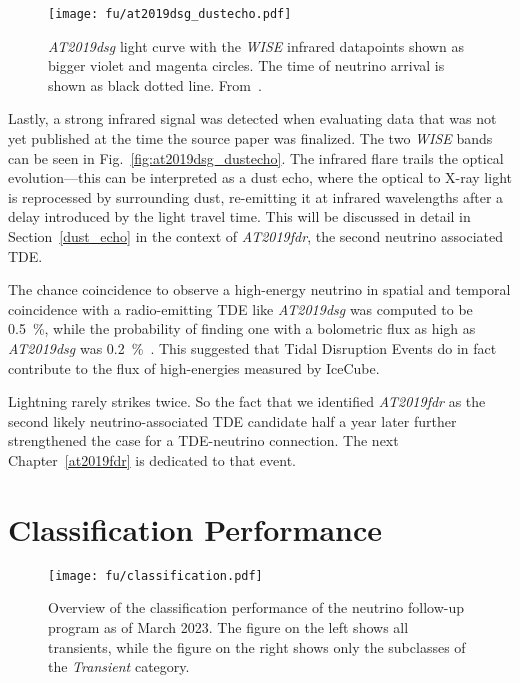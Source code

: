 \begin{figure}[htb]
    \texttt{[image: fu/at2019dsg\_dustecho.pdf]}
    \caption[\textit{AT2019dsg} infrared light curve]{\textit{AT2019dsg} light curve with the \textit{WISE} infrared datapoints shown as bigger violet and magenta circles. The time of neutrino arrival is shown as black dotted line. From~\cite{Reusch2023b}.}
\end{figure}

\pagebreak

Lastly, a strong infrared signal was detected when evaluating   data that was not yet published at the time the source paper was finalized. The two \textit{WISE} bands can be seen in Fig.~\ref{fig:at2019dsg_dustecho}. The infrared flare trails the optical evolution---this can be interpreted as a dust echo, where the optical to X-ray light is reprocessed by surrounding dust, re-emitting it at infrared wavelengths after a delay introduced by the light travel time. This will be discussed in detail in Section~\ref{dust_echo} in the context of \emph{AT2019fdr}, the second neutrino associated TDE.

The chance coincidence to observe a high-energy neutrino in spatial and temporal coincidence with a radio-emitting TDE like \emph{AT2019dsg} was computed to be \SI{0.5}{\percent}, while the probability of finding one with a bolometric flux as high as \emph{AT2019dsg} was \SI{0.2}{\percent}~\cite{Stein2021}. This suggested that Tidal Disruption Events do in fact contribute to the flux of high-energies measured by IceCube.

Lightning rarely strikes twice. So the fact that we identified \emph{AT2019fdr} as the second likely neutrino-associated TDE candidate half a year later further strengthened the case for a TDE-neutrino connection. The next Chapter~\ref{at2019fdr} is dedicated to that event.

\section{Classification Performance}\label{classification_performance}

\begin{figure*}[htb]
    \texttt{[image: fu/classification.pdf]}
    \caption[Follow-up classification overview]{Overview of the classification performance of the neutrino follow-up program as of March 2023. The figure on the left shows all transients, while the figure on the right shows only the subclasses of the \textit{Transient} category.}
\end{figure*}

